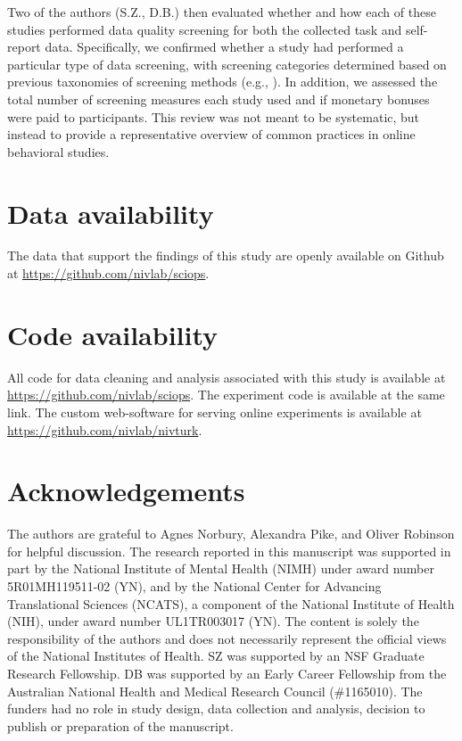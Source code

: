 \documentclass[a4paper,notitlepage,12pt]{article}
\begin{document}
Two of the authors (S.Z., D.B.) then evaluated whether and how each of these studies performed data quality screening for both the collected task and self-report data. Specifically, we confirmed whether a study had performed a particular type of data screening, with screening categories determined based on previous taxonomies of screening methods (e.g., \cite{curran2016methods}). In addition, we assessed the total number of screening measures each study used and if monetary bonuses were paid to participants. This review was not meant to be systematic, but instead to provide a representative overview of common practices in online behavioral studies.

\section*{Data availability}

The data that support the findings of this study are openly available on Github at \url{https://github.com/nivlab/sciops}.

\section*{Code availability}

All code for data cleaning and analysis associated with this study is available at \url{https://github.com/nivlab/sciops}. The experiment code is available at the same link.  The custom web-software for serving online experiments is available at \url{https://github.com/nivlab/nivturk}. 

\section*{Acknowledgements}

The authors are grateful to Agnes Norbury, Alexandra Pike, and Oliver Robinson for helpful discussion. The research reported in this manuscript was supported in part by the National Institute of Mental Health (NIMH) under award number 5R01MH119511-02 (YN), and by the National Center for Advancing Translational Sciences (NCATS), a component of the National Institute of Health (NIH), under award number UL1TR003017 (YN). The content is solely the responsibility of the authors and does not necessarily represent the official views of the National Institutes of Health. SZ was supported by an NSF Graduate Research Fellowship. DB was supported by an Early Career Fellowship from the Australian National Health and Medical Research Council (\#1165010). The funders had no role in study design, data collection and analysis, decision to publish or preparation of the manuscript.
\end{document}
